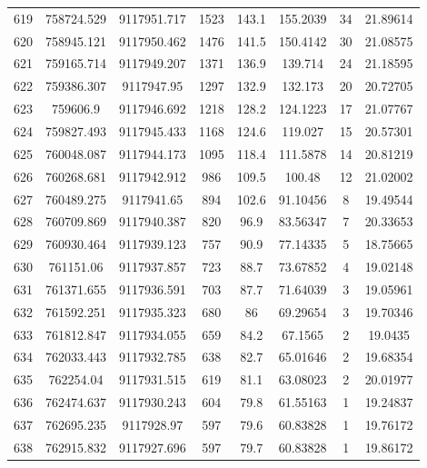 \begin{longtable}{cccccccc}
619  & 758724.529      & 9117951.717      & 1523    & 143.1 & 155.2039 & 34 & 21.89614 \\
620  & 758945.121      & 9117950.462      & 1476    & 141.5 & 150.4142 & 30 & 21.08575 \\
621  & 759165.714      & 9117949.207      & 1371    & 136.9 & 139.714  & 24 & 21.18595 \\
622  & 759386.307      & 9117947.95       & 1297    & 132.9 & 132.173  & 20 & 20.72705 \\
623  & 759606.9        & 9117946.692      & 1218    & 128.2 & 124.1223 & 17 & 21.07767 \\
624  & 759827.493      & 9117945.433      & 1168    & 124.6 & 119.027  & 15 & 20.57301 \\
625  & 760048.087      & 9117944.173      & 1095    & 118.4 & 111.5878 & 14 & 20.81219 \\
626  & 760268.681      & 9117942.912      & 986     & 109.5 & 100.48   & 12 & 21.02002 \\
627  & 760489.275      & 9117941.65       & 894     & 102.6 & 91.10456 & 8  & 19.49544 \\
628  & 760709.869      & 9117940.387      & 820     & 96.9  & 83.56347 & 7  & 20.33653 \\
629  & 760930.464      & 9117939.123      & 757     & 90.9  & 77.14335 & 5  & 18.75665 \\
630  & 761151.06       & 9117937.857      & 723     & 88.7  & 73.67852 & 4  & 19.02148 \\
631  & 761371.655      & 9117936.591      & 703     & 87.7  & 71.64039 & 3  & 19.05961 \\
632  & 761592.251      & 9117935.323      & 680     & 86    & 69.29654 & 3  & 19.70346 \\
633  & 761812.847      & 9117934.055      & 659     & 84.2  & 67.1565  & 2  & 19.0435  \\
634  & 762033.443      & 9117932.785      & 638     & 82.7  & 65.01646 & 2  & 19.68354 \\
635  & 762254.04       & 9117931.515      & 619     & 81.1  & 63.08023 & 2  & 20.01977 \\
636  & 762474.637      & 9117930.243      & 604     & 79.8  & 61.55163 & 1  & 19.24837 \\
637  & 762695.235      & 9117928.97       & 597     & 79.6  & 60.83828 & 1  & 19.76172 \\
638  & 762915.832      & 9117927.696      & 597     & 79.7  & 60.83828 & 1  & 19.86172 \\

\end{longtable}
